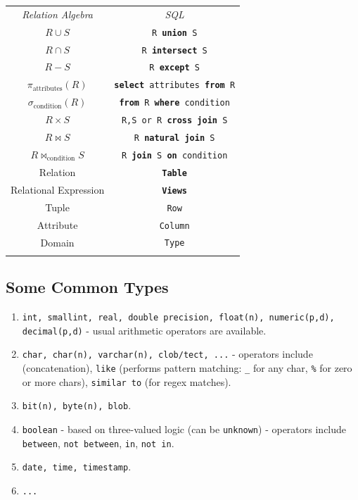\documentclass[twocolumn,english]{article}
\providecommand{\tabularnewline}{\\}
\begin{document}
\noindent 
\begin{table}[H]
\noindent \centering{}%
\begin{tabular}{cc}
\toprule 
\addlinespace[0.1cm]
\emph{Relation Algebra} & \emph{SQL}\tabularnewline\addlinespace[0.1cm]
\midrule
\addlinespace[0.1cm]
$R\cup S$ & \texttt{R }\texttt{\textbf{union}}\texttt{ S}\tabularnewline\addlinespace[0.1cm]
\addlinespace[0.1cm]
$R\cap S$ & \texttt{R }\texttt{\textbf{intersect}}\texttt{ S}\tabularnewline\addlinespace[0.1cm]
\addlinespace[0.1cm]
$R-S$ & \texttt{R }\texttt{\textbf{except}}\texttt{ S}\tabularnewline\addlinespace[0.1cm]
\addlinespace[0.1cm]
$\pi_{\mbox{attributes}}\left(R\right)$ & \texttt{\textbf{select}}\texttt{ attributes }\texttt{\textbf{from}}\texttt{
R}\tabularnewline\addlinespace[0.1cm]
\addlinespace[0.1cm]
$\sigma_{\mbox{condition}}\left(R\right)$ & \texttt{\textbf{from}}\texttt{ R }\texttt{\textbf{where}}\texttt{
condition}\tabularnewline\addlinespace[0.1cm]
\addlinespace[0.1cm]
$R\times S$ & \texttt{R,S or R }\texttt{\textbf{cross join}}\texttt{ S}\tabularnewline\addlinespace[0.1cm]
\addlinespace[0.1cm]
$R\bowtie S$ & \texttt{R }\texttt{\textbf{natural join}}\texttt{ S}\tabularnewline\addlinespace[0.1cm]
\addlinespace[0.1cm]
$R\bowtie_{\mbox{condition}}S$ & \texttt{R }\texttt{\textbf{join}}\texttt{ S }\texttt{\textbf{on}}\texttt{
condition}\tabularnewline\addlinespace[0.1cm]
\midrule
\addlinespace[0.1cm]
Relation & \texttt{\textbf{Table}}\tabularnewline\addlinespace[0.1cm]
\addlinespace[0.1cm]
Relational Expression & \texttt{\textbf{Views}}\tabularnewline\addlinespace[0.1cm]
\addlinespace[0.1cm]
Tuple & \texttt{Row}\tabularnewline\addlinespace[0.1cm]
\addlinespace[0.1cm]
Attribute & \texttt{Column}\tabularnewline\addlinespace[0.1cm]
\addlinespace[0.1cm]
Domain & \texttt{Type}\tabularnewline\addlinespace[0.1cm]
\bottomrule
\end{tabular}
\end{table}



\subsection{Some Common Types}
\begin{enumerate}
\item \texttt{int, smallint, real, double precision, float(n), numeric(p,d),
decimal(p,d)} - usual arithmetic operators are available.
\item \texttt{char, char(n), varchar(n), clob/tect, ...} - operators include
\texttt{\textbar{}\textbar{}} (concatenation), \texttt{like} (performs
pattern matching: \texttt{\_} for any char, \texttt{\%} for zero or
more chars), \texttt{similar to} (for regex matches).
\item \texttt{bit(n), byte(n), blob}.
\item \texttt{boolean} - based on three-valued logic (can be \texttt{unknown})
- operators include \texttt{between}, \texttt{not between}, \texttt{in},
\texttt{not in}.
\item \texttt{date, time, timestamp}.
\item \texttt{...}
\end{enumerate}
\end{document}

